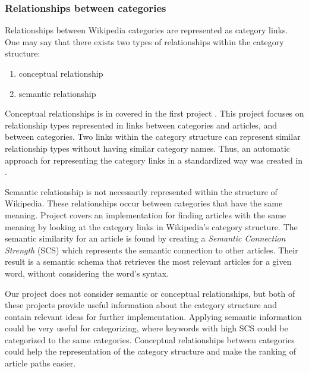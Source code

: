 \begin{comment}

Taking advantage of the category structure: 
-Extracting Semantic Relationships between Wikipedia Categories: chernov2006extracting
-Identyfing document topics using the Wikipedia category network: schonhofen2009identifying
-decoding wikipedia categories for knowledge adcquistion: nastase2008decoding

\end{comment}


\subsubsection{Relationships between categories}
Relationships between Wikipedia categories are represented as category links. One may say that there exists two types of relationships within the category structure: 
\begin{enumerate}
\item conceptual relationship
\item semantic relationship
\end{enumerate}



Conceptual relationships is in covered in the first project \cite[][]{nastase2008decoding}. This project focuses on relationship types represented in links between categories and articles, and between categories. Two links within the category structure can represent similar relationship types without having similar category names.   
Thus,  an automatic approach for representing the category links in a standardized way was created in \cite[][]{nastase2008decoding}.

Semantic relationship is not necessarily represented within the structure of Wikipedia. These relationships occur between categories that have the same meaning. Project  \cite[][]{chernov2006extracting} covers an  implementation for finding articles with the same meaning by looking at the category links in Wikipedia's category structure. The semantic similarity for an article is found by creating a \emph{Semantic Connection Strength} (SCS) which represents the semantic connection to other articles. Their result is a semantic schema that retrieves the most relevant articles for a given word, without considering the word's syntax. 

Our project does not consider semantic or conceptual relationships, but both of these projects provide useful information about the category structure and contain relevant ideas for further implementation. Applying semantic information could be very useful for categorizing, where keywords with high SCS could be categorized to the same categories. Conceptual relationships between categories could help the representation of the category structure and make the ranking of article paths easier. 

